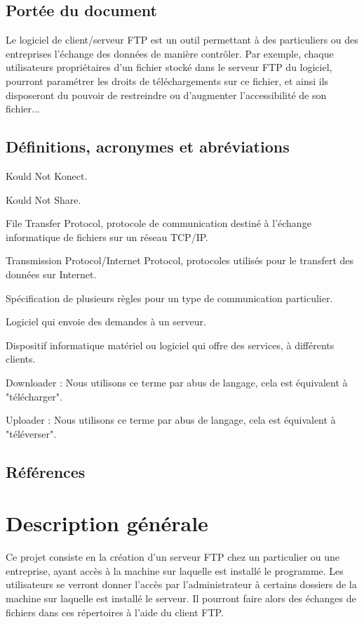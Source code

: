 \documentclass[10pt,a4paper]{report}
\begin{document}
\subsection{Portée du document}
Le logiciel de client/serveur FTP est un outil permettant à des particuliers ou des entreprises l'échange des données de manière contrôler. Par exemple, chaque utilisateurs propriétaires d'un fichier stocké dans le serveur FTP du logiciel, pourront paramétrer les droits de téléchargements sur ce fichier, et ainsi ils disposeront du pouvoir de restreindre ou d'augmenter l'accessibilité de son fichier...


\subsection{Définitions, acronymes et abréviations}
\begin{description}
\item[KNK] Kould Not Konect.
\item[KNS] Kould Not Share.
\item[FTP] File Transfer Protocol, protocole de communication destiné à l'échange informatique de fichiers sur un réseau TCP/IP.
\item[TCP/IP] Transmission Protocol/Internet Protocol, protocoles utilisés pour le transfert des données sur Internet.
\item[Protocole] Spécification de plusieurs règles pour un type de communication particulier.
\item[Client] Logiciel qui envoie des demandes à un serveur.
\item[Serveur] Dispositif informatique matériel ou logiciel qui offre des services, à différents clients.
\item Downloader : Nous utilisons ce terme par abus de langage, cela est équivalent à "télécharger".
\item Uploader : Nous utilisons ce terme par abus de langage, cela est équivalent à "téléverser".
\end{description}

\subsection{Références}


\section{Description générale}

Ce projet consiste en la création d'un serveur FTP chez un particulier ou une entreprise, ayant accès à la machine sur laquelle est installé le programme. Les utilisateurs se verront donner l'accès par l'administrateur à certains dossiers de la machine sur laquelle est installé le serveur. Il pourront faire alors des échanges de fichiers dans ces répertoires à l'aide du client FTP.
\end{document}

